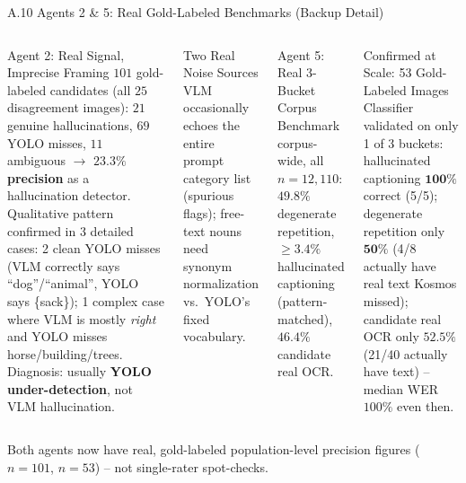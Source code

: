 \documentclass[aspectratio=169,11pt]{beamer}
\begin{document}
\begin{frame}{A.10 Agents 2 \& 5: Real Gold-Labeled Benchmarks (Backup Detail)}
\scriptsize
\begin{columns}[T]
\begin{block}{Agent 2: Real Signal, Imprecise Framing}
$101$ gold-labeled candidates (all $25$ disagreement images): $21$ genuine hallucinations, $69$ YOLO misses, $11$ ambiguous $\to$ \textbf{$23.3\%$ precision} as a hallucination detector. Qualitative pattern confirmed in 3 detailed cases: 2 clean YOLO misses (VLM correctly says ``dog''/``animal'', YOLO says \{sack\}); 1 complex case where VLM is mostly \emph{right} and YOLO misses horse/building/trees. Diagnosis: usually \textbf{YOLO under-detection}, not VLM hallucination.
\end{block}
\begin{alertblock}{Two Real Noise Sources}
\scriptsize VLM occasionally echoes the entire prompt category list (spurious flags); free-text nouns need synonym normalization vs.\ YOLO's fixed vocabulary.
\end{alertblock}

\begin{block}{Agent 5: Real 3-Bucket Corpus Benchmark}
corpus-wide, all $n=12{,}110$: $\mathbf{49.8\%}$ degenerate repetition, $\mathbf{\ge 3.4\%}$ hallucinated captioning (pattern-matched), $\mathbf{46.4\%}$ candidate real OCR.
\end{block}
\begin{block}{Confirmed at Scale: 53 Gold-Labeled Images}
Classifier validated on only 1 of 3 buckets: hallucinated captioning $\mathbf{100\%}$ correct (5/5); degenerate repetition only $\mathbf{50\%}$ (4/8 actually have real text Kosmos missed); candidate real OCR only $\mathbf{52.5\%}$ (21/40 actually have text) -- median WER $100\%$ even then.
\end{block}
\end{columns}
\vskip 0.15cm
{\tiny\color{PrismGray} Both agents now have real, gold-labeled population-level precision figures ($n=101$, $n=53$) -- not single-rater spot-checks.}
\end{frame}
\end{document}
